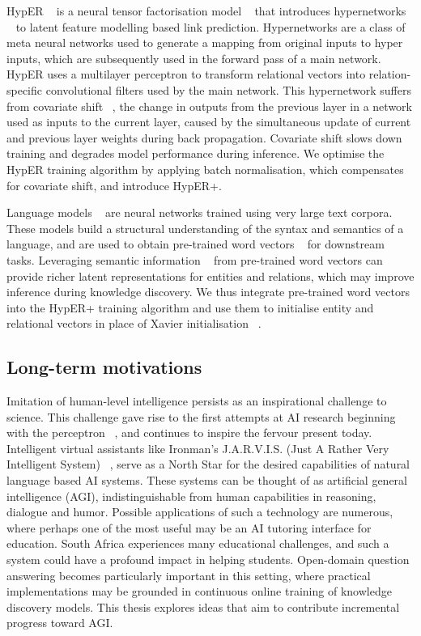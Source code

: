 \noindent HypER \unskip~\citep{balazevic2019hypernetwork} is a neural tensor factorisation model \unskip~\citep{wu2018neural} that introduces hypernetworks \unskip~\citep{ha2016hypernetworks} to latent feature modelling based link prediction. Hypernetworks are a class of meta neural networks used to generate a mapping from original inputs to hyper inputs, which are subsequently used in the forward pass of a main network. HypER uses a multilayer perceptron to transform relational vectors into relation-specific convolutional filters used by the main network. This hypernetwork suffers from covariate shift \unskip~\citep{ioffe2015batch}, the change in outputs from the previous layer in a network used as inputs to the current layer, caused by the simultaneous update of current and previous layer weights during back propagation. Covariate shift slows down training and degrades model performance during inference. We optimise the HypER training algorithm by applying batch normalisation, which compensates for covariate shift, and introduce HypER+. \par

\noindent Language models \unskip~\citep{turian2010word} are neural networks trained using very large text corpora. These models build a structural understanding of the syntax and semantics of a language, and are used to obtain pre-trained word vectors \unskip~\citep{mikolov2013distributed} for downstream tasks. Leveraging semantic information \unskip~\citep{socher2013reasoning} from pre-trained word vectors can provide richer latent representations for entities and relations, which may improve inference during knowledge discovery. We thus integrate pre-trained word vectors into the HypER+ training algorithm and use them to initialise entity and relational vectors in place of Xavier initialisation \unskip~\citep{glorot2010understanding}. 

\subsection{Long-term motivations} 

Imitation of human-level intelligence persists as an inspirational challenge to science. This challenge gave rise to the first attempts at AI research beginning with the perceptron \unskip~\citep{rosenblatt1958perceptron}, and continues to inspire the fervour present today. Intelligent virtual assistants like Ironman's J.A.R.V.I.S. (Just A Rather Very Intelligent System) \unskip~\citep{jarvisIronmanWiki}, serve as a North Star for the desired capabilities of natural language based AI systems. These systems can be thought of as artificial general intelligence (AGI), indistinguishable from human capabilities in reasoning, dialogue and humor. Possible applications of such a technology are numerous, where perhaps one of the most useful may be an AI tutoring interface for education. South Africa experiences many educational challenges, and such a system could have a profound impact in helping students. Open-domain question answering becomes particularly important in this setting, where practical implementations may be grounded in continuous online training of knowledge discovery models. This thesis explores ideas that aim to contribute incremental progress toward AGI.  

